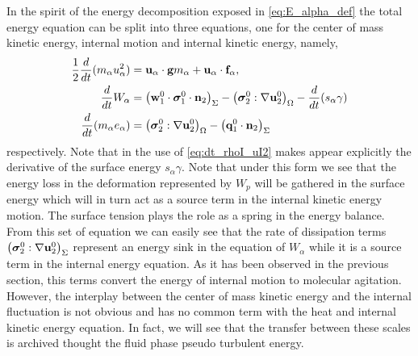 In the spirit of the energy decomposition exposed in \ref{eq:E_alpha_def} the total energy equation can be split into three equations, one for the center of mass kinetic energy, internal motion and internal kinetic energy, namely,  
\begin{align}
    \label{eq:dt_u2_alpha}
    \frac{1}{2}\frac{d}{d t} (m_\alpha u_\alpha^2)
    &= 
    \textbf{u}_\alpha\cdot
    \textbf{g}m_\alpha
    + 
    \textbf{u}_\alpha\cdot
    \textbf{f}_\alpha,\\
    \label{eq:dt_w2_alpha}
    \frac{d}{d t} W_\alpha 
    &= 
    \left( \textbf{w}_1^0 \cdot \bm{\sigma}_1^0 \cdot \textbf{n}_2  \right)_\Sigma
    - \left(  \bm{\sigma}_2^0 : \mathbf{\nabla}\textbf{u}_2^0  \right)_\Omega
    - \frac{d}{d t} (s_\alpha \gamma) 
    \\
     \label{eq:dt_e_alpha}
    \frac{d}{d t} (m_\alpha e_\alpha )
    &= 
     \left(  \bm{\sigma}_2^0 : \mathbf{\nabla}\textbf{u}_2^0   \right)_\Omega
    -  \left( \textbf{q}_1^0\cdot \textbf{n}_2  \right)_\Sigma 
\end{align}
respectively. 
Note that in \citet{eq:dt_w2_alpha} the use of \ref{eq:dt_rhoI_uI2} makes appear explicitly the derivative of the surface energy $s_\alpha \gamma$. 
Note that under this form we see that the energy loss in the deformation represented by $W_p$ will be gathered in the surface energy which will in turn act as a source term in the internal kinetic energy motion.
The surface tension plays the role as a spring in the energy balance.   
From this set of equation we can easily see that the rate of dissipation terms $\left( \bm{\sigma}_2^0 : \mathbf{\nabla}\textbf{u}_2^0 \right)_\Sigma$ represent an energy sink in the equation of $W_\alpha$ while it is a source term in the internal energy equation. 
As it has been observed in the previous section, this terms convert the energy of internal motion to molecular agitation. 
However, the interplay between the center of mass  kinetic energy and the internal fluctuation is not obvious and has no common term with the heat and internal kinetic energy equation.
In fact, we will see that the transfer between these scales is archived thought the fluid phase pseudo turbulent energy. 


